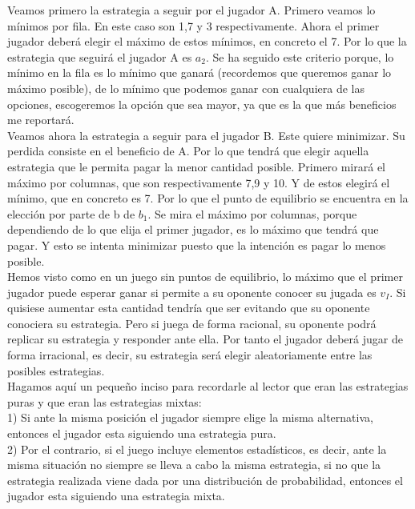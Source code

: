 \documentclass[10pt,a4paper]{book}
\begin{document}
Veamos primero la estrategia a seguir por el jugador A. Primero veamos lo mínimos por fila. En este caso son 1,7 y 3 respectivamente. Ahora el primer jugador deberá elegir el máximo de estos mínimos, en concreto el 7. Por lo que la estrategia que seguirá el jugador A es $a_2$. Se ha seguido este criterio porque, lo mínimo en la fila es lo mínimo que ganará (recordemos que queremos ganar lo máximo posible), de lo mínimo que podemos ganar con cualquiera de las opciones, escogeremos la opción que sea mayor, ya que es la que más beneficios me reportará.\\
 Veamos ahora la estrategia a seguir para el jugador B. Este quiere minimizar. Su perdida consiste en el beneficio de A. Por lo que tendrá que elegir aquella estrategia que le permita pagar la menor cantidad posible. Primero mirará el máximo por columnas, que son respectivamente 7,9 y 10. Y de estos elegirá el mínimo, que en concreto es 7. Por lo que el punto de equilibrio se encuentra en la elección por parte de b de $b_1$. Se mira el máximo por columnas, porque dependiendo de lo que elija el primer jugador, es lo máximo que tendrá que pagar. Y esto se intenta minimizar puesto que la intención es pagar lo menos posible.\\


Hemos visto como en un juego sin puntos de equilibrio, lo máximo que el primer jugador puede esperar ganar si permite a su oponente conocer su jugada es $v_I$.  Si quisiese aumentar esta cantidad tendría que ser evitando que su oponente conociera su estrategia. Pero si juega de forma racional, su oponente podrá replicar su estrategia y responder ante ella. Por tanto el jugador deberá jugar de forma irracional, es decir, su estrategia será elegir aleatoriamente entre las posibles estrategias.\\

Hagamos aquí un pequeño inciso para recordarle al lector que eran las estrategias puras y que eran las estrategias mixtas:\\

1)	Si ante la misma posición el jugador siempre elige la misma alternativa, entonces el jugador esta siguiendo una estrategia pura.\\

2)	Por el contrario, si el juego incluye elementos estadísticos, es decir, ante la misma situación no siempre se lleva a cabo la misma estrategia, si no que la estrategia realizada viene dada por una distribución de probabilidad, entonces el jugador esta siguiendo una estrategia mixta.\\
\end{document}
